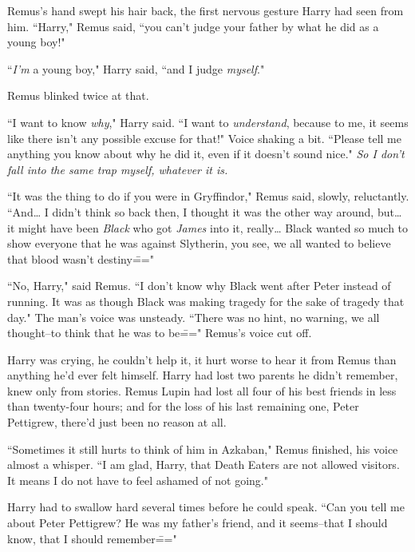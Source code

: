 Remus's hand swept his hair back, the first nervous gesture Harry had seen from him. ``Harry," Remus said, ``you can't judge your father by what he did as a young boy!"

``\emph{I'm} a young boy," Harry said, ``and I judge \emph{myself}."

Remus blinked twice at that.

``I want to know \emph{why}," Harry said. ``I want to \emph{understand}, because to me, it seems like there isn't any possible excuse for that!" Voice shaking a bit. ``Please tell me anything you know about why he did it, even if it doesn't sound nice." \emph{So I don't fall into the same trap myself, whatever it is.}

``It was the thing to do if you were in Gryffindor," Remus said, slowly, reluctantly. ``And{\ldots} I didn't think so back then, I thought it was the other way around, but{\ldots} it might have been \emph{Black} who got \emph{James} into it, really{\ldots} Black wanted so much to show everyone that he was against Slytherin, you see, we all wanted to believe that blood wasn't destiny\==="

\later

``No, Harry," said Remus. ``I don't know why Black went after Peter instead of running. It was as though Black was making tragedy for the sake of tragedy that day." The man's voice was unsteady. ``There was no hint, no warning, we all thought\---to think that he was to be\===" Remus's voice cut off.

Harry was crying, he couldn't help it, it hurt worse to hear it from Remus than anything he'd ever felt himself. Harry had lost two parents he didn't remember, knew only from stories. Remus Lupin had lost all four of his best friends in less than twenty-four hours; and for the loss of his last remaining one, Peter Pettigrew, there'd just been no reason at all.

``Sometimes it still hurts to think of him in Azkaban," Remus finished, his voice almost a whisper. ``I am glad, Harry, that Death Eaters are not allowed visitors. It means I do not have to feel ashamed of not going."

Harry had to swallow hard several times before he could speak. ``Can you tell me about Peter Pettigrew? He was my father's friend, and it seems\---that I should know, that I should remember\==="

